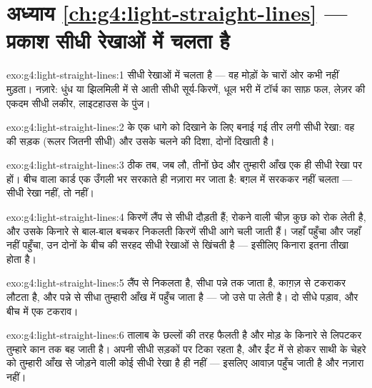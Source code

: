 \section*{अध्याय \ref{ch:g4:light-straight-lines} --- प्रकाश सीधी रेखाओं में चलता है}

\begin{solution}{exo:g4:light-straight-lines:1}
 सीधी रेखाओं में चलता है --- वह मोड़ों के चारों ओर कभी नहीं
मुड़ता। नज़ारे: धुंध या झिलमिली में से आती सीधी सूर्य-किरणें, धूल भरी
 में टॉर्च का साफ़ फल, लेज़र की एकदम सीधी लकीर, लाइटहाउस के पुंज।
\end{solution}

\begin{solution}{exo:g4:light-straight-lines:2}
 के एक धागे को दिखाने के लिए बनाई गई तीर लगी सीधी रेखा: वह
 की सड़क (रूलर जितनी सीधी) और उसके चलने की दिशा, दोनों दिखाती
है।
\end{solution}

\begin{solution}{exo:g4:light-straight-lines:3}
ठीक तब, जब लौ, तीनों छेद और तुम्हारी आँख एक ही सीधी रेखा पर हों। बीच
वाला कार्ड एक उँगली भर सरकाते ही नज़ारा मर जाता है:  बग़ल में
सरककर नहीं चलता --- सीधी रेखा नहीं, तो  नहीं।
\end{solution}

\begin{solution}{exo:g4:light-straight-lines:4}
किरणें लैंप से सीधी दौड़ती हैं; रोकने वाली चीज़ कुछ को रोक लेती है,
और उसके किनारे से बाल-बाल बचकर निकलती किरणें सीधी आगे चली जाती हैं।
जहाँ  पहुँचा और जहाँ नहीं पहुँचा, उन दोनों के बीच की सरहद सीधी
रेखाओं से खिंचती है --- इसीलिए किनारा इतना तीखा होता है।
\end{solution}

\begin{solution}{exo:g4:light-straight-lines:5}
 लैंप से निकलता है, सीधा पन्ने तक जाता है, काग़ज़ से टकराकर
लौटता है, और पन्ने से सीधा तुम्हारी आँख में पहुँच जाता है --- जो उसे
पा लेती है। दो सीधे पड़ाव, और बीच में एक टकराव।
\end{solution}

\begin{solution}{exo:g4:light-straight-lines:6}
 तालाब के छल्लों की तरह फैलती है और मोड़ के किनारे से लिपटकर
तुम्हारे कान तक बह जाती है।  अपनी सीधी सड़कों पर टिका रहता है,
और ईंट में से होकर साथी के चेहरे को तुम्हारी आँख से जोड़ने वाली कोई
सीधी रेखा है ही नहीं --- इसलिए आवाज़ पहुँच जाती है और नज़ारा नहीं।
\end{solution}


